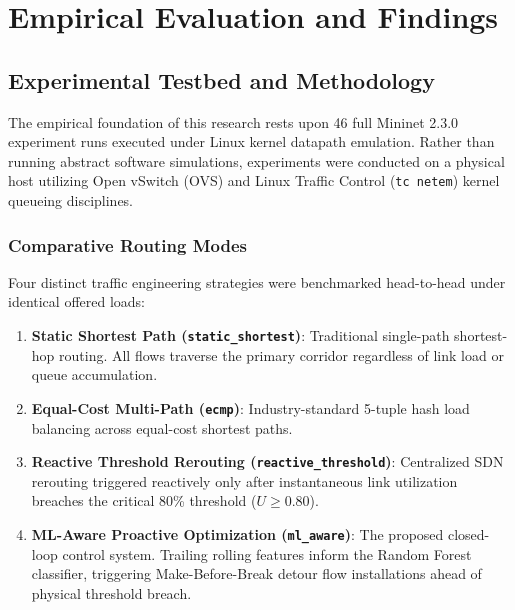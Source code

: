 \chapter{Empirical Evaluation and Findings}
\label{ch:experiments_evaluation}

\section{Experimental Testbed and Methodology}
The empirical foundation of this research rests upon 46 full Mininet 2.3.0 experiment runs executed under Linux kernel datapath emulation. Rather than running abstract software simulations, experiments were conducted on a physical host utilizing Open vSwitch (OVS) and Linux Traffic Control (\texttt{tc netem}) kernel queueing disciplines.

\subsection{Comparative Routing Modes}
Four distinct traffic engineering strategies were benchmarked head-to-head under identical offered loads:
\begin{enumerate}
  \item \textbf{Static Shortest Path (\texttt{static\_shortest})}: Traditional single-path shortest-hop routing. All flows traverse the primary corridor regardless of link load or queue accumulation.
  \item \textbf{Equal-Cost Multi-Path (\texttt{ecmp})}: Industry-standard 5-tuple hash load balancing across equal-cost shortest paths.
  \item \textbf{Reactive Threshold Rerouting (\texttt{reactive\_threshold})}: Centralized SDN rerouting triggered reactively only after instantaneous link utilization breaches the critical 80\% threshold ($U \ge 0.80$).
  \item \textbf{ML-Aware Proactive Optimization (\texttt{ml\_aware})}: The proposed closed-loop control system. Trailing rolling features inform the Random Forest classifier, triggering Make-Before-Break detour flow installations ahead of physical threshold breach.
\end{enumerate}

